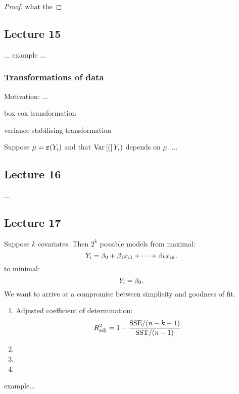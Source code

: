 \begin{proof}
    
    what the

\end{proof}




\subsection*{Lecture 15}


... example ...


\subsubsection*{Transformations of data}
Motivation:
...


box cox transformation
 

variance stabilising transformation

Suppose $\mu=\boldsymbol{\varepsilon}(Y_i)$ and that $\mathrm{Var}\left[(\right]Y_i)$ depends on $\mu$. ...

 

\subsection*{Lecture 16}

...






\subsection*{Lecture 17}
Suppose $k$ covariates. Then $2^k$ possible models from maximal:
$$
    Y_i = \beta_0+\beta_1x_{i1} + \dots + \beta_kx_{ik}.
$$
to minimal:
$$
    Y_i = \beta_0.
$$
We want to arrive at a compromise between simplisity and goodness of fit. 

\begin{enumerate}
    \item Adjusted coefficient of determination:
    $$
        R^2_{\mathrm{adj}} = 1 - \frac{\mathrm{SSE} / (n-k-1)}{\mathrm{SST} / (n-1)}
    $$
    \item 
    \item 
    \item 
\end{enumerate}
  

example...

